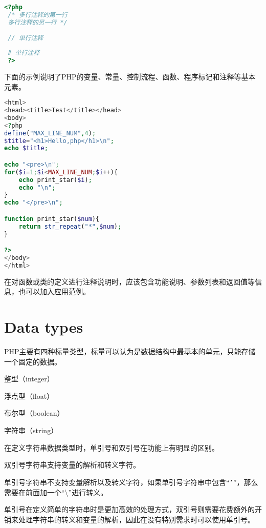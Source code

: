\begin{lstlisting}[language=PHP]
 <?php
 /* 多行注释的第一行
 多行注释的另一行 */
 
 // 单行注释
 
 # 单行注释
 ?>
\end{lstlisting}


下面的示例说明了PHP的变量、常量、控制流程、函数、程序标记和注释等基本元素。



\begin{lstlisting}[language=PHP]
<html>
<head><title>Test</title></head>
<body>
<?php
define("MAX_LINE_NUM",4);
$title="<h1>Hello,php</h1>\n";
echo $title;

echo "<pre>\n";
for($i=1;$i<MAX_LINE_NUM;$i++){
    echo print_star($i);
    echo "\n";
}
echo "</pre>\n";

function print_star($num){
    return str_repeat("*",$num);
}

?>
</body>
</html>
\end{lstlisting}

在对函数或类的定义进行注释说明时，应该包含功能说明、参数列表和返回值等信息，也可以加入应用范例。



\chapter{Data types}

PHP主要有四种标量类型，标量可以认为是数据结构中最基本的单元，只能存储一个固定的数据。

\begin{compactitem}
\item 整型（integer）
\item 浮点型（float）
\item 布尔型（boolean）
\item 字符串（string）
\end{compactitem}

在定义字符串数据类型时，单引号和双引号在功能上有明显的区别。

\begin{compactitem}
\item 双引号字符串支持变量的解析和转义字符。
\item 单引号字符串不支持变量解析以及转义字符，如果单引号字符串中包含“\texttt{'}”，那么需要在前面加一个“\textbackslash ”进行转义。
\end{compactitem}

单引号在定义简单的字符串时是更加高效的处理方式，双引号则需要花费额外的开销来处理字符串的转义和变量的解析，因此在没有特别需求时可以使用单引号。

